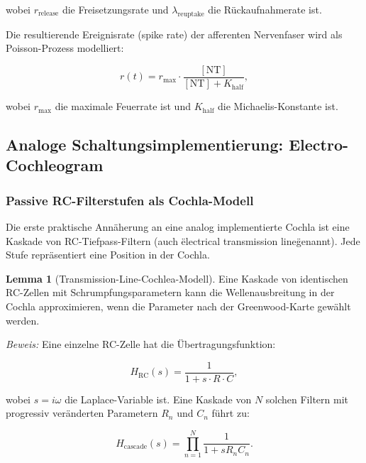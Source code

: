 ﻿\documentclass[12pt, a4paper]{article}
\theoremstyle{definition}
\newtheorem{lemma}{Lemma}[section]
\theoremstyle{remark}
\begin{document}
wobei $r_{\mathrm{release}}$ die Freisetzungsrate und $\lambda_{\mathrm{reuptake}}$ 
die Rückaufnahmerate ist.

Die resultierende Ereignisrate (spike rate) der afferenten Nervenfaser wird als 
Poisson-Prozess modelliert:

\begin{equation}
\label{eq:spike_rate}
r(t) = r_{\max} \cdot \frac{[\mathrm{NT}]}{[\mathrm{NT}] + K_{\mathrm{half}}},
\end{equation}

wobei $r_{\max}$ die maximale Feuerrate ist und $K_{\mathrm{half}}$ die 
Michaelis-Konstante ist.

\subsection{Analoge Schaltungsimplementierung: Electro-Cochleogram}

\subsubsection{Passive RC-Filterstufen als Cochla-Modell}

Die erste praktische Annäherung an eine analog implementierte Cochla ist eine 
Kaskade von RC-Tiefpass-Filtern (auch \"electrical transmission line\" genannt). 
Jede Stufe repräsentiert eine Position in der Cochla.

\begin{lemma}[Transmission-Line-Cochlea-Modell]
\label{lem:transmission_line}
Eine Kaskade von identischen RC-Zellen mit Schrumpfungsparametern kann die 
Wellenausbreitung in der Cochla approximieren, wenn die Parameter nach der 
Greenwood-Karte gewählt werden.
\end{lemma}

\emph{Beweis:} Eine einzelne RC-Zelle hat die Übertragungsfunktion:

\begin{equation}
\label{eq:rc_transfer}
H_{\mathrm{RC}}(s) = \frac{1}{1 + s \cdot R \cdot C},
\end{equation}

wobei $s = i\omega$ die Laplace-Variable ist. Eine Kaskade von $N$ solchen 
Filtern mit progressiv veränderten Parametern $R_n$ und $C_n$ führt zu:

\begin{equation}
H_{\mathrm{cascade}}(s) = \prod_{n=1}^{N} \frac{1}{1 + s R_n C_n}.
\end{equation}
\end{document}
